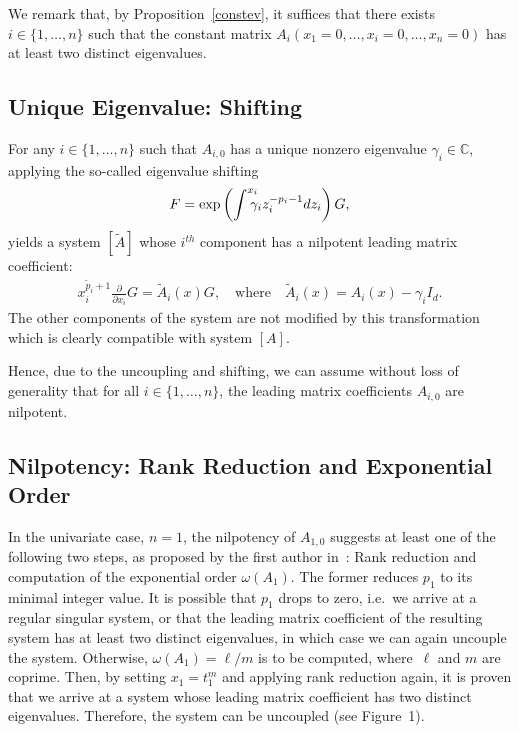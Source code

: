 \documentclass[final,1p,times,number,amsthm]{elsart}
\newcommand{\pder}[2]{\frac{\partial}{\partial #2}#1}
\begin{document}
We remark that, by Proposition~\ref{constev}, it suffices that there exists
$i \in \{1 , \dots, n\}$ such that the constant matrix
$A_{i}(x_1=0, \dots, x_{i}=0, \dots, x_n=0)$ has at least two distinct
eigenvalues.

\subsection{Unique Eigenvalue: Shifting}
\label{shiftpfaff}
For any $i\in\{1,\dots,n\}$ such that $A_{i,0}$ has a unique nonzero
eigenvalue $\gamma_{i} \in \mathbb{C}$, applying the so-called eigenvalue
shifting
\begin{equation*}
F = \operatorname{exp}\left(\int^{\text{\rlap{$x_{i}$}}}\gamma_{i}
  z_{i}^{-p_{i}-1} dz_{i}\right)  G,
\end{equation*}
yields a system $[\tilde{A}]$ whose ${i}^{th}$ component has a nilpotent leading
matrix coefficient:
\begin{eqnarray*}
  x_i^{\tilde{p}_i+1} \pder{G}{x_i} = \tilde{A}_i{(x)} G, \quad \text{where}
\quad \tilde{A}_{i}{(x)} = A_{i}{(x)} - \gamma_{i} I_d .
\end{eqnarray*}
The other components of the system are not modified by this transformation which
is clearly compatible with system $[A]$.

Hence, due to the uncoupling and shifting, we can assume without
loss of generality that for all $i \in \{ 1, \dots, n\}$, the leading matrix
coefficients $A_{i,0}$ are nilpotent.
\subsection{Nilpotency: Rank Reduction and Exponential Order}
\label{rampfaff}
In the univariate case, $n=1$, the nilpotency of $A_{1,0}$ suggests at least one
of the following two steps, as proposed by the first author in~\cite{key24}:
Rank reduction and computation of the exponential order $\omega(A_1)$. The
former reduces $p_1$ to its minimal integer value. It is possible that $p_1$
drops to zero, i.e.\ we arrive at a regular singular system, or that the leading matrix
coefficient of the resulting system has at least two distinct eigenvalues, in
which case we can again uncouple the system. Otherwise,
$\omega(A_1) = \ell / m$ is to be computed, where~$\ell$ and $m$ are
coprime. Then, by setting $x_1 = t_1^{m}$ and applying rank reduction again, it
is proven that we arrive at a system whose leading matrix coefficient has two
distinct eigenvalues. Therefore, the system can be uncoupled (see
Figure~1).
\end{document}
